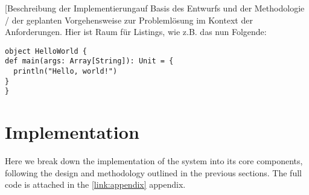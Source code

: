 
[Beschreibung der Implementierung\footnotemark auf Basis des Entwurfs und der Methodologie / der geplanten Vorgehensweise zur Probleml\"osung im Kontext der Anforderungen. Hier ist Raum f\"ur Listings, wie z.B. das nun Folgende:



\begin{lstlisting}[caption={Ein Beispiel: Hello World (Scala)}]
object HelloWorld {
def main(args: Array[String]): Unit = {
  println("Hello, world!")
}
}
\end{lstlisting}

\section{Implementation}
Here we break down the implementation of the system into its core components, following the design and methodology outlined in the previous sections. The full code is attached in the \ref{link:appendix} appendix.